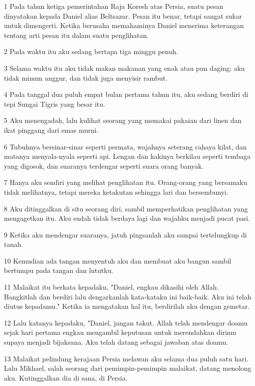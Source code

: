\par 1 Pada tahun ketiga pemerintahan Raja Koresh atas Persia, suatu pesan dinyatakan kepada Daniel alias Beltsazar. Pesan itu benar, tetapi sangat sukar untuk dimengerti. Ketika berusaha memahaminya Daniel menerima keterangan tentang arti pesan itu dalam suatu penglihatan.
\par 2 Pada waktu itu aku sedang bertapa tiga minggu penuh.
\par 3 Selama waktu itu aku tidak makan makanan yang enak atau pun daging; aku tidak minum anggur, dan tidak juga menyisir rambut.
\par 4 Pada tanggal dua puluh empat bulan pertama tahun itu, aku sedang berdiri di tepi Sungai Tigris yang besar itu.
\par 5 Aku menengadah, lalu kulihat seorang yang memakai pakaian dari linen dan ikat pinggang dari emas murni.
\par 6 Tubuhnya bersinar-sinar seperti permata, wajahnya seterang cahaya kilat, dan matanya menyala-nyala seperti api. Lengan dan kakinya berkilau seperti tembaga yang digosok, dan suaranya terdengar seperti suara orang banyak.
\par 7 Hanya aku sendiri yang melihat penglihatan itu. Orang-orang yang bersamaku tidak melihatnya, tetapi mereka ketakutan sehingga lari dan bersembunyi.
\par 8 Aku ditinggalkan di situ seorang diri, sambil memperhatikan penglihatan yang mengagetkan itu. Aku sudah tidak berdaya lagi dan wajahku menjadi pucat pasi.
\par 9 Ketika aku mendengar suaranya, jatuh pingsanlah aku sampai tertelungkup di tanah.
\par 10 Kemudian ada tangan menyentuh aku dan membuat aku bangun sambil bertumpu pada tangan dan lututku.
\par 11 Malaikat itu berkata kepadaku, "Daniel, engkau dikasihi oleh Allah. Bangkitlah dan berdiri lalu dengarkanlah kata-kataku ini baik-baik. Aku ini telah diutus kepadamu." Ketika ia mengatakan hal itu, berdirilah aku dengan gemetar.
\par 12 Lalu katanya kepadaku, "Daniel, jangan takut. Allah telah mendengar doamu sejak hari pertama engkau mengambil keputusan untuk merendahkan dirimu supaya menjadi bijaksana. Aku telah datang sebagai jawaban atas doamu.
\par 13 Malaikat pelindung kerajaan Persia melawan aku selama dua puluh satu hari. Lalu Mikhael, salah seorang dari pemimpin-pemimpin malaikat, datang menolong aku. Kutinggalkan dia di sana, di Persia.
